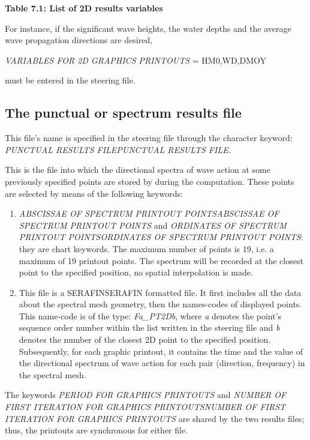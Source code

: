 \textbf{Table 7.1: List of 2D results variables}

 For instance, if the significant wave heights, the water depths and the average wave propagation directions are desired,

 \textit{VARIABLES FOR 2D GRAPHICS PRINTOUTS }= HM0,WD,DMOY

 must be entered in the steering file.


\subsection{ The punctual or spectrum results file}

 This file's name is specified in the steering file through the character keyword: \textit{PUNCTUAL RESULTS FILEPUNCTUAL RESULTS FILE.}

 This is the file into which the directional spectra of wave action at some previously specified points are stored by \tomawac during the computation. These points are selected by means of the following keywords:

\begin{enumerate}
\item  \textit{ABSCISSAE OF SPECTRUM PRINTOUT POINTSABSCISSAE OF SPECTRUM PRINTOUT POINTS} and \textit{ORDINATES OF SPECTRUM PRINTOUT POINTSORDINATES OF SPECTRUM PRINTOUT POINTS}: they are chart keywords. The maximum number of points is 19, i.e. a maximum of 19 printout points. The spectrum will be recorded at the closest point to the specified position, no spatial interpolation is made.

\item  This file is a SERAFINSERAFIN formatted file. It first includes all the data about the spectral mesh geometry, then the names-codes of displayed points. This name-code is of the type: \textit{Fa\_PT2Db}, where \textit{a }denotes the point's sequence order number within the list written in the steering file and \textit{b} denotes the number of the closest 2D point to the specified position. Subsequently, for each graphic printout, it contains the time and the value of the directional spectrum of wave action for each pair (direction, frequency) in the spectral mesh.
\end{enumerate}

 The keywords \textit{PERIOD FOR GRAPHICS PRINTOUTS }and \textit{NUMBER OF FIRST ITERATION FOR GRAPHICS PRINTOUTSNUMBER OF FIRST ITERATION FOR GRAPHICS PRINTOUTS} are shared by the two results files; thus, the printouts are synchronous for either file.


